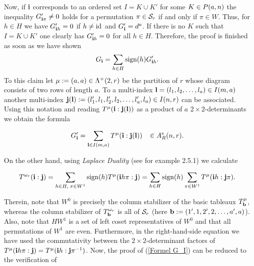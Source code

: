 \documentclass[twoside,12pt]{article}
\begin{document}
\begin{Pf}

Now, if ${\bf i}$ corresponds to an ordered set $I=K\cup K'$ for some $K \in
P({a},{n})$ the inequality
$G_{{\bf i}\pi}'\neq 0$ holds for a permutation $\pi\in {\cal S}_{r}$ if and only if
$\pi \in W$. Thus, for $h\in H$ we have $G_{{\bf i}h}'=0$ if $h\neq
{\rm id}_{}$ and $G_{{\bf i}}'=d^a$. If there is no $K$ such that $I=K\cup K'$ one
clearly has $G_{{\bf i}h}'=0$ for all $h\in H$.
Therefore, the proof is finished
as soon as we have shown
\begin{equation} \label{Formel G_I}
G_{{\bf i}}=\sum_{h \in H}{\rm sign}(h) G_{{\bf i}h}'.
\end{equation}
To this claim
let $\mu :=(a,a) \in \Lambda^+(2, r)$ be the partition of $r$ whose diagram
consists of two rows of length $a$. To a multi-index ${\bf l}=(l_1,l_2,
\ldots , l_a)\in I(m,a)$ another multi-index ${\bf j}({\bf l}):=(l_1', l_1,
l_2', l_2, \ldots , l_a', l_a)\in I(n,r)$ can be associated.
Using this notation and reading $T^{\mu}({\bf i}:{\bf j}({\bf l}))$ as a
product of $a$ $2\times 2$-determinants we obtain the formula

\[ G_{{\bf i}}'=
\sum_{{\bf l} \in I(m,a) }
T^{\mu}({\bf i}:{\bf j}({\bf l}))\;\;\;
 \in A^{{\rm s}}_{R}(n,r). \]


On the other hand, using {\em Laplace Duality} (see for example
\cite{martin} 2.5.1) we calculate

\begin{equation}\label{laplace klassisch}
T^{\omega_r}({\bf i}:{\bf j})=\sum_{h\in H,\;\pi \in W^1}{\rm sign}(h)
T^{\mu}({\bf i}h\pi:{\bf j})=
\sum_{h\in H}{\rm sign}(h)\sum_{\pi \in W^1}
T^{\mu}({\bf i}h:{\bf j}\pi).
\end{equation}


Therein, note that $W^0$ is precisely the column stabilizer of the
basic tableaux $T^{\mu}_{{\bf b}}$, whereas the column stabilizer
of $T^{\omega_r}_{{\bf b}}$ is all of ${\cal S}_{r}$ (here ${\bf b}:=(1',1,2',2,\ldots ,a',a)$). Also, note that $HW^1$ is a set of left
coset representatives of $W^0$ and that all permutations of $W^1$ are even.
Furthermore, in the right-hand-side equation we have used the
commutativity between the $2\times 2$-determinant factors of 
$T^{\mu}({\bf i}h\pi:{\bf j})=T^{\mu}({\bf i}h:{\bf j}\pi^{-1})$. Now, the proof of
(\ref{Formel G_I}) can be reduced to the verification of


\end{Pf}
\end{document}

